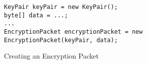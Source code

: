 \begin{figure}[H]
  \centering
  \begin{verbatim}
KeyPair keyPair = new KeyPair();
byte[] data = ...;
...
EncryptionPacket encryptionPacket = new EncryptionPacket(keyPair, data);
  \end{verbatim}
  \caption{Creating an Encryption Packet}
  \label{code:encryption_packet_instantiation}
\end{figure}
